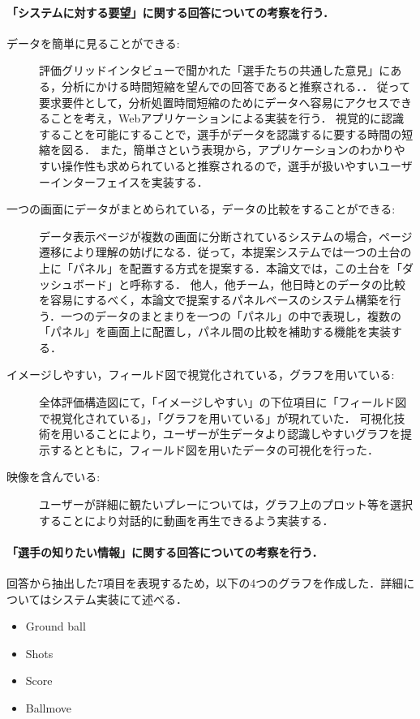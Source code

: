 \documentclass[sotsuron]{kuee}
\begin{document}
					\paragraph {「システムに対する要望」に関する回答についての考察を行う．}
						\begin{description}
							\item [データを簡単に見ることができる:]
							評価グリッドインタビューで聞かれた「選手たちの共通した意見」にある，分析にかける時間短縮を望んでの回答であると推察される．．
							従って要求要件として，分析処置時間短縮のためにデータへ容易にアクセスできることを考え，Webアプリケーションによる実装を行う．
							視覚的に認識することを可能にすることで，選手がデータを認識するに要する時間の短縮を図る．
							また，簡単さという表現から，アプリケーションのわかりやすい操作性も求められていると推察されるので，選手が扱いやすいユーザーインターフェイスを実装する．
							
							\item [一つの画面にデータがまとめられている，データの比較をすることができる:]
							データ表示ページが複数の画面に分断されているシステムの場合，ページ遷移により理解の妨げになる．従って，本提案システムでは一つの土台の上に「パネル」を配置する方式を提案する．本論文では，この土台を「ダッシュボード」と呼称する．
							他人，他チーム，他日時とのデータの比較を容易にするべく，本論文で提案するパネルベースのシステム構築を行う．一つのデータのまとまりを一つの「パネル」の中で表現し，複数の「パネル」を画面上に配置し，パネル間の比較を補助する機能を実装する．
							
							\item [イメージしやすい，フィールド図で視覚化されている，グラフを用いている:]
							全体評価構造図にて，「イメージしやすい」の下位項目に「フィールド図で視覚化されている」，「グラフを用いている」が現れていた．
							可視化技術を用いることにより，ユーザーが生データより認識しやすいグラフを提示するとともに，フィールド図を用いたデータの可視化を行った．
							
							\item [映像を含んでいる:]
							ユーザーが詳細に観たいプレーについては，グラフ上のプロット等を選択することにより対話的に動画を再生できるよう実装する．
						\end{description}
					\paragraph {「選手の知りたい情報」に関する回答についての考察を行う．}
						回答から抽出した7項目を表現するため，以下の4つのグラフを作成した．詳細についてはシステム実装にて述べる．
							\begin{itemize}
								\item Ground ball
								\item Shots
								\item Score
								\item Ballmove
							\end{itemize}	
\end{document}
